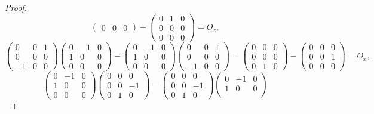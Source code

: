 \documentclass[11pt, letterpaper]{article}
\begin{document}
\begin{proof}
\[\begin{pmatrix}
		0 & 0 & 0
		\end{pmatrix}-\begin{pmatrix}
		0 & 1 & 0 \\
		0 & 0 & 0 \\
		0 & 0 & 0
		\end{pmatrix}=O_z,
	\]
	\[
		\begin{pmatrix}
		0 & 0 & 1 \\
		0 & 0 & 0 \\
		-1 & 0 & 0
		\end{pmatrix}\begin{pmatrix}
		0 & -1 & 0 \\
		1 & 0 & 0 \\
		0 & 0 & 0
		\end{pmatrix}-\begin{pmatrix}
		0 & -1 & 0 \\
		1 & 0 & 0 \\
		0 & 0 & 0
		\end{pmatrix}\begin{pmatrix}
		0 & 0 & 1 \\
		0 & 0 & 0 \\
		-1 & 0 & 0
		\end{pmatrix}=\begin{pmatrix}
		0 & 0 & 0 \\
		0 & 0 & 0 \\
		0 & 1 & 0
		\end{pmatrix}-\begin{pmatrix}
		0 & 0 & 0 \\
		0 & 0 & 1 \\
		0 & 0 & 0
		\end{pmatrix}=O_x
	,\]
	\[
		\begin{pmatrix}
		0 & -1 & 0 \\
		1 & 0 & 0 \\
		0 & 0 & 0
		\end{pmatrix}\begin{pmatrix}
		0 & 0 & 0 \\
		0 & 0 & -1 \\
		0 & 1 & 0
		\end{pmatrix}-\begin{pmatrix}
		0 & 0 & 0 \\
		0 & 0 & -1 \\
		0 & 1 & 0
		\end{pmatrix}\begin{pmatrix}
		0 & -1 & 0 \\
		1 & 0 & 0 \\

\end{pmatrix}\]
\end{proof}
\end{document}
